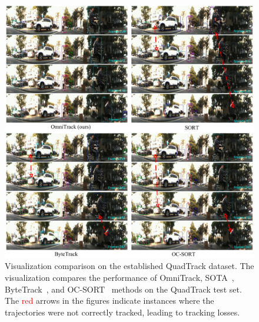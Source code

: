 \begin{figure}[!t]
  \centering
  \includegraphics[width=1\textwidth]{imgs/tracking_vis_v3_2.pdf}
  \caption{Visualization comparison on the established QuadTrack dataset. The visualization compares the performance of OmniTrack, SOTA~\cite{bewley2016simple}, ByteTrack~\cite{zhang2022bytetrack}, and OC-SORT~\cite{cao2023observation} methods on the QuadTrack test set. The \textcolor{red}{red} arrows in the figures indicate instances where the trajectories were not correctly tracked, leading to tracking losses.}
  \label{fig:vis_img_quadtrack}
\end{figure}

%
